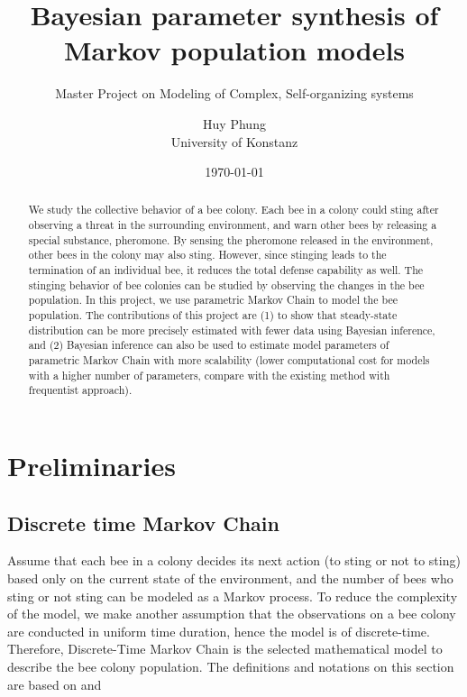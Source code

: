 \documentclass[12pt]{article}
\title{Bayesian parameter synthesis of Markov population models}
\subtitle{Master Project on Modeling of Complex, Self-organizing systems}
\author{Huy Phung\\University of Konstanz}
\date{\today}
\theoremstyle{definition}
\begin{document}
\maketitle

\begin{abstract}
  We study the collective behavior of a bee colony. Each bee in a colony could
  sting after observing a threat in the surrounding environment, and warn other
  bees by releasing a special substance, pheromone. By sensing the pheromone
  released in the environment, other bees in the colony may also sting. However,
  since stinging leads to the termination of an individual bee, it reduces the
  total defense capability as well. The stinging behavior of bee colonies can be
  studied by observing the changes in the bee population. In this project, we
  use parametric Markov Chain to model the bee population. The contributions of
  this project are (1) to show that steady-state distribution can be more
  precisely estimated with fewer data using Bayesian inference, and (2) Bayesian
  inference can also be used to estimate model parameters of parametric Markov
  Chain with more scalability (lower computational cost for models with a higher
  number of parameters, compare with the existing method with frequentist
  approach).
\end{abstract}

\section{Preliminaries}
\subsection{Discrete time Markov Chain}
Assume that each bee in a colony decides its next action (to sting or not to
sting) based only on the current state of the environment, and the number of
bees who sting or not sting can be modeled as a Markov process. To reduce the
complexity of the model, we make another assumption that the observations on a
bee colony are conducted in uniform time duration, hence the model is of
discrete-time. Therefore, Discrete-Time Markov Chain is the selected
mathematical model to describe the bee colony population. The definitions and
notations on this section are based on \cite{baier2008principles} and \cite{hajnal2019data}
\end{document}
